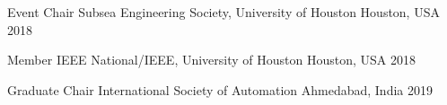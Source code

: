 





\begin{cvhonors}
	
	\cvhonor
	{Event Chair} %
	{Subsea Engineering Society, University of Houston} %
	{Houston, USA} %
	{2018} %
\end{cvhonors}


\begin{cvhonors}
	\cvhonor
	{Member} %
	{IEEE National/IEEE, University of Houston} %
	{Houston, USA} %
	{2018} %
\end{cvhonors}

\begin{cvhonors}
\cvhonor
	{Graduate Chair} %
	{International Society of Automation} %
	{Ahmedabad, India} %
	{2019} %
\end{cvhonors}


